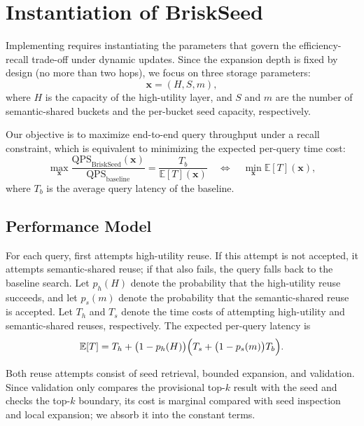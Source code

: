 \section{Instantiation of BriskSeed}
Implementing \system requires instantiating the parameters that govern the efficiency-recall trade-off under dynamic updates.
Since the expansion depth is fixed by design (no more than two hops), we focus on three storage parameters:
\begin{equation}
\mathbf{x}=(H,S,m),
\end{equation}
where $H$ is the capacity of the high-utility layer, and $S$ and $m$ are the number of semantic-shared buckets and the per-bucket seed capacity, respectively.

Our objective is to maximize end-to-end query throughput under a recall constraint, which is equivalent to minimizing the expected per-query time cost:
\begin{equation}
\max_{\mathbf{x}} \frac{\mathrm{QPS}_{\mathrm{BriskSeed}}(\mathbf{x})}{\mathrm{QPS}_{\mathrm{baseline}}}
=
\frac{T_b}{\mathbb{E}[T](\mathbf{x})}
\quad \Longleftrightarrow \quad
\min_{\mathbf{x}} \mathbb{E}[T](\mathbf{x}),
\end{equation}
where $T_b$ is the average query latency of the baseline.

\subsection{Performance Model}

For each query, \system first attempts high-utility reuse.
If this attempt is not accepted, it attempts semantic-shared reuse; if that also fails, the query falls back to the baseline search.
Let $p_h(H)$ denote the probability that the high-utility reuse succeeds, and let $p_s(m)$ denote the probability that the semantic-shared reuse is accepted.
Let $T_h$ and $T_s$ denote the time costs of attempting high-utility and semantic-shared reuses, respectively.
The expected per-query latency is
\begin{equation}
\mathbb{E}[T]
=
T_h
+
\bigl(1-p_h(H)\bigr)\Bigl(T_s+\bigl(1-p_s(m)\bigr)T_b\Bigr).
\label{eq:exp-latency}
\end{equation}

Both reuse attempts consist of seed retrieval, bounded expansion, and validation.
Since validation only compares the provisional top-$k$ result with the seed and checks the top-$k$ boundary, its cost is marginal compared with seed inspection and local expansion; we absorb it into the constant terms.




